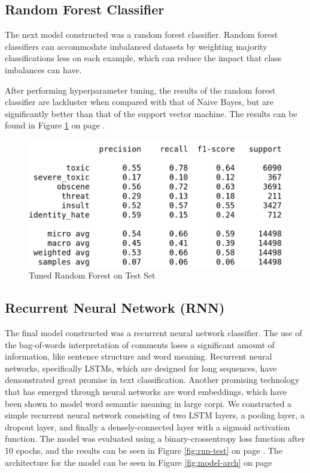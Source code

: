 \documentclass{article}
\begin{document}
{  \subsection{Random Forest Classifier}{
	  The next model constructed was a random forest classifier. Random forest
	  classifiers can accommodate imbalanced datasets by weighting majority
	  classifications less on each example, which can reduce the impact that class
	  imbalances can have.

	  After performing hyperparameter tuning, the results of the random forest
	  classifier are lackluster when compared with that of Naive Bayes, but are
	  significantly better than that of the support vector machine. The results
	  can be found in Figure \ref{fig:rf-test} on page \pageref{fig:rf-test}.

	  \begin{figure}[h]
		  \centering
		  \includegraphics[width=\textwidth]{rf-test-set.png}
		  \caption{Tuned Random Forest on Test Set}
		  \label{fig:rf-test}
	  \end{figure}
  }

  \subsection{Recurrent Neural Network (RNN)}{
	  The final model constructed was a recurrent neural network classifier. The
	  use of the bag-of-words interpretation of comments loses a significant
	  amount of information, like sentence structure and word meaning. Recurrent
	  neural networks, specifically LSTMs, which are designed for long sequences,
	  have demonstrated great promise in text classification. Another promising
	  technology that has emerged through neural networks are word embeddings,
	  which have been shown to model word semantic meaning in large corpi. We
	  constructed a simple recurrent neural network consisting of two LSTM layers,
	  a pooling layer, a dropout layer, and finally a densely-connected layer with
	  a sigmoid activation function. The model was evaluated using a
	  binary-crossentropy loss function after 10 epochs, and the results can be
    seen in Figure \ref{fig:rnn-test} on page \pageref{fig:rnn-test}. The 
    architecture for the model can be seen in Figure \ref{fig:model-arch} on 
    page \pageref{fig:model-arch}
    
}}
\end{document}
